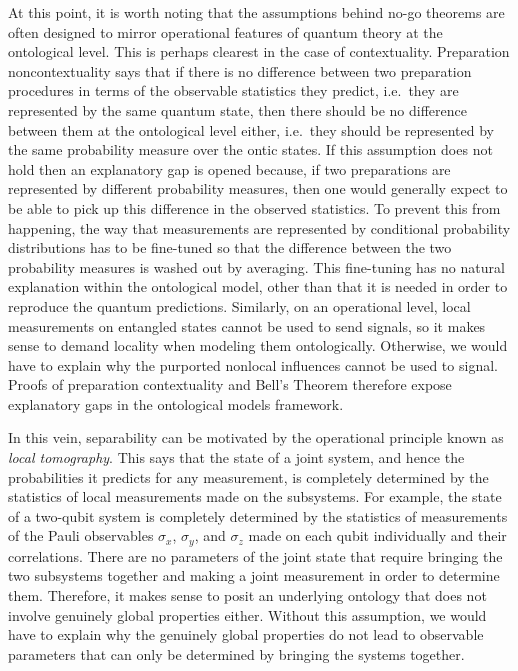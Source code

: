 \documentclass[DIV=calc,paper=a4,fontsize=11pt,twocolumn]{scrartcl} %
\theoremstyle{definition}
\theoremstyle{plain}
\begin{document}
At this point, it is worth noting that the assumptions behind no-go
theorems are often designed to mirror operational features of quantum
theory at the ontological level.  This is perhaps clearest in the case
of contextuality.  Preparation noncontextuality says that if there is
no difference between two preparation procedures in terms of the
observable statistics they predict, i.e.\ they are represented by the
same quantum state, then there should be no difference between them at
the ontological level either, i.e.\ they should be represented by the
same probability measure over the ontic states.  If this assumption
does not hold then an explanatory gap is opened because, if two
preparations are represented by different probability measures, then
one would generally expect to be able to pick up this difference in
the observed statistics.  To prevent this from happening, the way that
measurements are represented by conditional probability distributions
has to be fine-tuned so that the difference between the two
probability measures is washed out by averaging.  This fine-tuning has
no natural explanation within the ontological model, other than that
it is needed in order to reproduce the quantum predictions.
Similarly, on an operational level, local measurements on entangled
states cannot be used to send signals, so it makes sense to demand
locality when modeling them ontologically.  Otherwise, we would have
to explain why the purported nonlocal influences cannot be used to
signal.  Proofs of preparation contextuality and Bell's Theorem
therefore expose explanatory gaps in the ontological models framework.

In this vein, separability can be motivated by the operational
principle known as \emph{local tomography}.  This says that the state
of a joint system, and hence the probabilities it predicts for any
measurement, is completely determined by the statistics of local
measurements made on the subsystems.  For example, the state of a
two-qubit system is completely determined by the statistics of
measurements of the Pauli observables $\sigma_x$, $\sigma_y$, and
$\sigma_z$ made on each qubit individually and their correlations.
There are no parameters of the joint state that require bringing the
two subsystems together and making a joint measurement in order to
determine them.  Therefore, it makes sense to posit an underlying
ontology that does not involve genuinely global properties either.
Without this assumption, we would have to explain why the genuinely
global properties do not lead to observable parameters that can only
be determined by bringing the systems together.
\end{document}
